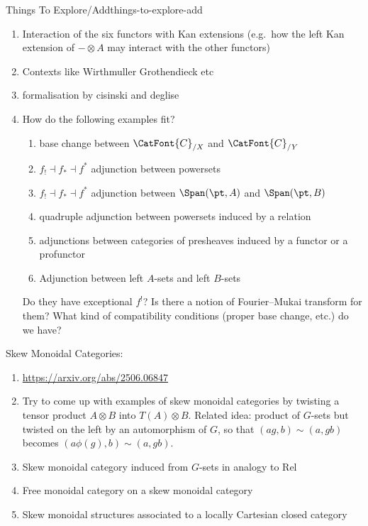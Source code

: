 \begin{remark}{Things To Explore/Add}{things-to-explore-add}
\begin{enumerate}
\begin{enumerate}
\begin{quote}
                    \end{quote}
                    interesting?
            \end{enumerate}
        \item Interaction of the six functors with Kan extensions (e.g.\ how the left Kan extension of $-\otimes A$ may interact with the other functors)
        \item Contexts like Wirthmuller Grothendieck etc
        \item formalisation by cisinski and deglise
        \item How do the following examples fit?
            \begin{enumerate}
                \item base change between $\CatFont{C}_{/X}$ and $\CatFont{C}_{/Y}$
                \item $f_{!}\dashv f_{*}\dashv f^{*}$ adjunction between powersets
                \item $f_{!}\dashv f_{*}\dashv f^{*}$ adjunction between $\Span(\pt,A)$ and $\Span(\pt,B)$
                \item quadruple adjunction between powersets induced by a relation
                \item adjunctions between categories of presheaves induced by a functor or a profunctor
                \item Adjunction between left $A$-sets and left $B$-sets
            \end{enumerate}
            Do they have exceptional $f^{!}$? Is there a notion of Fourier--Mukai transform for them? What kind of compatibility conditions (proper base change, etc.) do we have?
    \end{enumerate}
    Skew Monoidal Categories:
    \begin{enumerate}
        \item \url{https://arxiv.org/abs/2506.06847}
        \item Try to come up with examples of skew monoidal categories by twisting a tensor product $A\otimes B$ into $T(A)\otimes B$. Related idea: product of $G$-sets but twisted on the left by an automorphism of $G$, so that $(ag,b)\sim(a,gb)$ becomes $(a\phi(g),b)\sim(a,gb)$.
        \item Skew monoidal category induced from $G$-sets in analogy to Rel
        \item Free monoidal category on a skew monoidal category
        \item Skew monoidal structures associated to a locally Cartesian closed category

\end{enumerate}
\end{remark}
